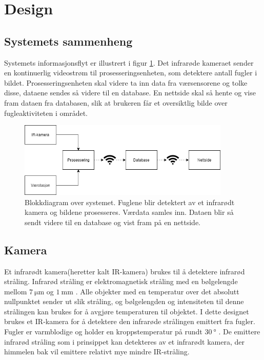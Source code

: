 \section{Design}\label{sec:design}
\subsection{Systemets sammenheng}\label{sec:design:sammenheng}

Systemets informasjonsflyt er illustrert i figur \ref{fig:blokkDig}. 
Det infrarøde kameraet sender en kontinuerlig videostrøm til prosesseringsenheten, som detektere antall fugler i bildet. 
Prosesseringsenheten skal videre ta inn data fra værsensorene og tolke disse, dataene sendes så videre til en database. 
En nettside skal så hente og vise fram dataen fra databasen, slik at brukeren får et oversiktlig bilde over fugleaktiviteten i området. 

\begin{figure}[H]
    \centering
    \includegraphics[width=0.9\textwidth]{design/designflytskjema.png}
    \caption{Blokkdiagram over systemet. Fuglene blir detektert av et infrarødt kamera og bildene prosesseres. Værdata samles inn. Dataen blir så sendt videre til en database og vist fram på en nettside.}
    \label{fig:blokkDig}
\end{figure}


\subsection{Kamera}\label{sec:design:kamera}

Et infrarødt kamera(heretter kalt IR-kamera) brukes til å detektere infrarød stråling. 
Infrarød stråling er elektromagnetisk stråling med en bølgelengde mellom $\SI{7}{\micro\meter}$ og $\SI{1}{\milli\meter}$ \cite{SNL-IR}. 
Alle objekter med en temperatur over det absolutt nullpunktet sender ut slik stråling, og bølgelengden og intensiteten til denne strålingen kan brukes for å avgjøre temperaturen til objektet. 
I dette designet brukes et IR-kamera for å detektere den infrarøde strålingen emittert fra fugler. 
Fugler er varmblodige og holder en kroppstemperatur på rundt $\SI{30}{\degree}$ \cite{snlfugl}.
De emittere infrarød stråling som i prinsippet kan detekteres av et infrarødt kamera, der himmelen bak vil emittere relativt mye mindre IR-stråling.

